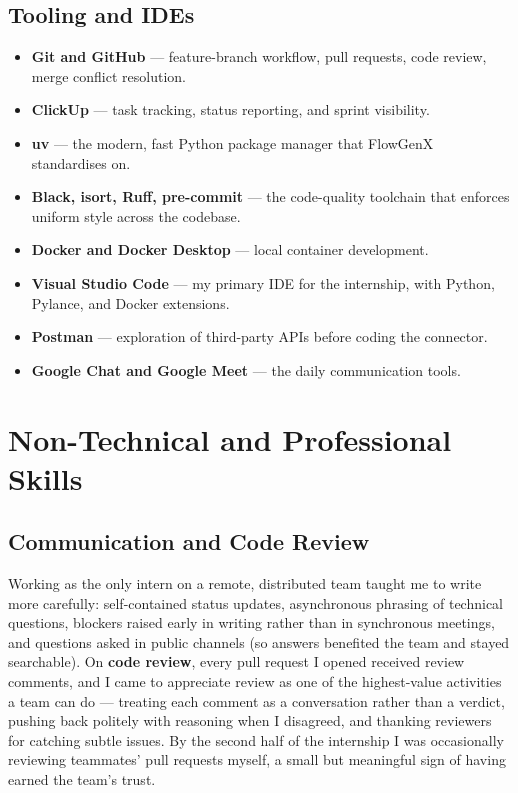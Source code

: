 \subsection{Tooling and IDEs}
\begin{itemize}[leftmargin=*]
    \item \textbf{Git and GitHub} --- feature-branch workflow, pull
    requests, code review, merge conflict resolution.
    \item \textbf{ClickUp} --- task tracking, status reporting, and
    sprint visibility.
    \item \textbf{uv} --- the modern, fast Python package manager that
    FlowGenX standardises on.
    \item \textbf{Black, isort, Ruff, pre-commit} --- the code-quality
    toolchain that enforces uniform style across the codebase.
    \item \textbf{Docker and Docker Desktop} --- local container
    development.
    \item \textbf{Visual Studio Code} --- my primary IDE for the
    internship, with Python, Pylance, and Docker extensions.
    \item \textbf{Postman} --- exploration of third-party APIs before
    coding the connector.
    \item \textbf{Google Chat and Google Meet} --- the daily
    communication tools.
\end{itemize}

\section{Non-Technical and Professional Skills}

\subsection{Communication and Code Review}
Working as the only intern on a remote, distributed team taught me to
write more carefully: self-contained status updates, asynchronous
phrasing of technical questions, blockers raised early in writing
rather than in synchronous meetings, and questions asked in public
channels (so answers benefited the team and stayed searchable). On
\textbf{code review}, every pull request I opened received review
comments, and I came to appreciate review as one of the
highest-value activities a team can do --- treating each comment as
a conversation rather than a verdict, pushing back politely with
reasoning when I disagreed, and thanking reviewers for catching
subtle issues. By the second half of the internship I was
occasionally reviewing teammates' pull requests myself, a small but
meaningful sign of having earned the team's trust.

